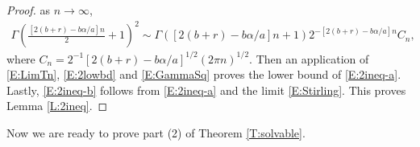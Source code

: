 \documentclass[12pt]{report}
\theoremstyle{plain}
\theoremstyle{definition}
\numberwithin{equation}{section}
\begin{document}
\begin{proof}
	as $n\to \infty$,
	\begin{align} \label{E:GammaSq}
	\Gamma\left( \frac{[2(b + r ) -b \alpha / a]n}{2} +1 \right)^2  \sim
	\Gamma\left( [2(b + r ) -b \alpha / a]n +1 \right)2^{- [2(b + r ) -b \alpha / a]n}C_n,
	\end{align}
	where $C_n = 2^{-1}[2(b + r ) -b \alpha / a]^{1/2}(2 \pi n )^{1/2}$. Then an application of
	\eqref{E:LimTn}, \eqref{E:2lowbd} and \eqref{E:GammaSq} proves the lower bound of
	\eqref{E:2ineq-a}. Lastly, \eqref{E:2ineq-b} follows from \eqref{E:2ineq-a} and the limit
	\eqref{E:Stirling}. This proves Lemma \ref{L:2ineq}.
\end{proof}

Now we are ready to prove part (2) of Theorem \ref{T:solvable}.
\end{document}
